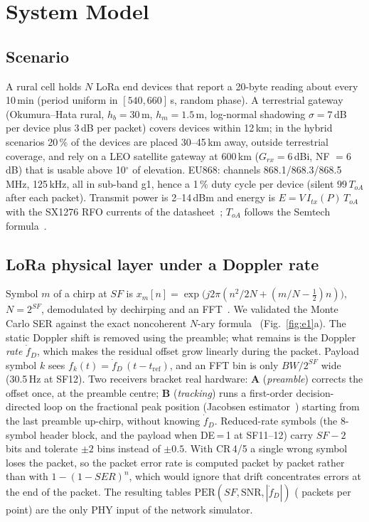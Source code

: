 \section{System Model}
\label{sec:model}

\subsection{Scenario}
A rural cell holds $N$ LoRa end devices that report a 20-byte reading about every 10\,min
(period uniform in $[540, 660]$\,s, random phase). A terrestrial gateway (Okumura--Hata rural,
$h_b=30$\,m, $h_m=1.5$\,m, log-normal shadowing $\sigma=7$\,dB per device plus 3\,dB per packet)
covers devices within 12\,km; in the hybrid scenarios 20\,\% of the devices are placed 30--45\,km
away, outside terrestrial coverage, and rely on a LEO satellite gateway at 600\,km
($G_{rx}=6$\,dBi, NF $=6$\,dB) that is usable above 10$^\circ$ of elevation.
EU868: channels 868.1/868.3/868.5\,MHz, 125\,kHz, all in sub-band g1, hence a 1\,\% duty cycle per
device (silent $99\,T_{oA}$ after each packet). Transmit power is 2--14\,dBm and energy is
$E=V\,I_{tx}(P)\,T_{oA}$ with the SX1276 RFO currents of the datasheet~\cite{semtechSX1276};
$T_{oA}$ follows the Semtech formula~\cite{semtechAN120013}.

\subsection{LoRa physical layer under a Doppler rate}
Symbol $m$ of a chirp at $SF$ is $x_m[n]=\exp\!\big(j2\pi(n^2/2N+(m/N-\tfrac12)n)\big)$, $N=2^{SF}$,
demodulated by dechirping and an FFT~\cite{vangelista2017}. We validated the Monte Carlo SER against the exact
noncoherent $N$-ary formula~\cite{proakis} (Fig.~\ref{fig:e1}a). The static Doppler shift is removed using the
preamble; what remains is the Doppler \emph{rate} $\dot f_D$, which makes the residual offset grow
linearly during the packet. Payload symbol $k$ sees
$f_k(t)=\dot f_D\,(t-t_{\mathrm{ref}})$, and an FFT bin is only $BW/2^{SF}$ wide
(30.5\,Hz at SF12). Two receivers bracket real hardware:
\textbf{A} (\emph{preamble}) corrects the offset once, at the preamble centre;
\textbf{B} (\emph{tracking}) runs a first-order decision-directed loop on the fractional peak
position (Jacobsen estimator~\cite{jacobsen2007}) starting from the last preamble up-chirp, without knowing $\dot f_D$.
Reduced-rate symbols (the 8-symbol header block, and the payload when DE\,=\,1 at SF11--12)
carry $SF-2$ bits and tolerate $\pm2$ bins instead of $\pm0.5$. With CR\,4/5 a single wrong symbol
loses the packet, so the packet error rate is computed packet by packet rather than with
$1-(1-SER)^n$, which would ignore that drift concentrates errors at the end of the packet.
The resulting tables $\mathrm{PER}(SF,\mathrm{SNR},|\dot f_D|)$ (\PerPackets{} packets per point)
are the only PHY input of the network simulator.

